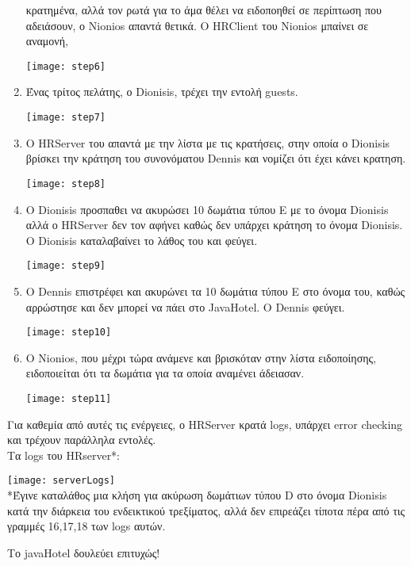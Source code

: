 \begin{enumerate}
    κρατημένα, αλλά τον ρωτά για το άμα θέλει να ειδοποηθεί σε περίπτωση που
    αδειάσουν, ο Nionios απαντά θετικά.
    Ο HRClient του Nionios μπαίνει σε αναμονή,
\begin{center}
    \texttt{[image: step6]}
\end{center}
\item Ένας τρίτος πελάτης, ο Dionisis, τρέχει την εντολή guests.
\begin{center}
    \texttt{[image: step7]}
\end{center}
\item Ο HRServer του απαντά με την λίστα με τις κρατήσεις, στην οποία ο 
    Dionisis βρίσκει την κράτηση του συνονόματου Dennis και νομίζει ότι έχει
    κάνει κρατηση.
\begin{center}
    \texttt{[image: step8]}
\end{center}
\item Ο Dionisis προσπαθει να ακυρώσει 10 δωμάτια τύπου E με το όνομα Dionisis
    αλλά ο HRServer δεν τον αφήνει καθώς δεν υπάρχει κράτηση το όνομα Dionisis.
    Ο Dionisis καταλαβαίνει το λάθος του και φεύγει.
\begin{center}
    \texttt{[image: step9]}
\end{center}
\item Ο Dennis επιστρέφει και ακυρώνει τα 10 δωμάτια τύπου Ε στο όνομα του,
    καθώς αρρώστησε και δεν μπορεί να πάει στο JavaHotel. Ο Dennis φεύγει.
\begin{center}
    \texttt{[image: step10]}
\end{center}
\item Ο Nionios, που μέχρι τώρα ανάμενε και βρισκόταν στην λίστα ειδοποίησης,
    ειδοποιείται ότι τα δωμάτια για τα οποία αναμένει άδειασαν.
\begin{center}
    \texttt{[image: step11]}
\end{center}
\end{enumerate}
Για καθεμία από αυτές τις ενέργειες, ο HRServer κρατά logs, υπάρχει error
checking και τρέχουν παράλληλα εντολές.
\\
Τα logs του HRserver*:
\begin{center}
    \texttt{[image: serverLogs]}
    \\
    *\footnotesize{Έγινε καταλάθος μια κλήση για ακύρωση δωμάτιων τύπου D στο
    όνομα Dionisis κατά την διάρκεια του ενδεικτικού τρεξίματος, αλλά δεν
    επιρεάζει τίποτα πέρα από τις γραμμές 16,17,18 των logs αυτών.}
\end{center}
Το javaHotel δουλεύει επιτυχώς!

